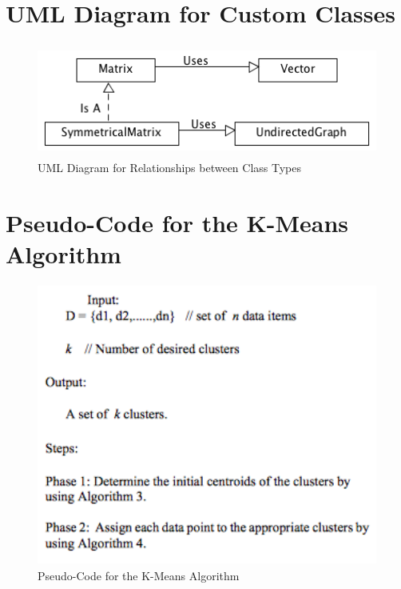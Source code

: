 \documentclass[12pt]{article}
\begin{document}
\newpage
\appendix
\appendixpage
\addappheadtotoc

\section{UML Diagram for Custom Classes}
\label{appendix:uml}
\begin{figure}[!htb]
\begin{center}
	\includegraphics[height=10em]{uml.png}
	\caption{UML Diagram for Relationships between Class Types}
\end{center}
\end{figure}

\newpage
\section{Pseudo-Code for the K-Means Algorithm}
\label{appendix:kmeans}
\begin{figure}[!htb]
\begin{center}
	\includegraphics[height=25em]{kmeans.png}
	\caption{Pseudo-Code for the K-Means Algorithm}
\end{center}
\end{figure}

\newpage
\end{document}
